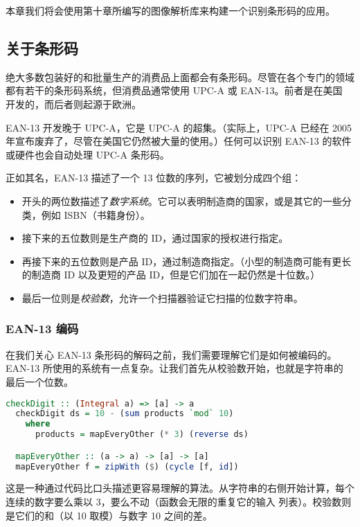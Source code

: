 \documentclass[./main.tex]{subfiles}
\begin{document}
本章我们将会使用第十章所编写的图像解析库来构建一个识别条形码的应用。

\subsection*{关于条形码}

绝大多数包装好的和批量生产的消费品上面都会有条形码。尽管在各个专门的领域都有若干的条形码系统，但消费品通常使用 UPC-A 或 EAN-13。前者是在美国
开发的，而后者则起源于欧洲。

EAN-13 开发晚于 UPC-A，它是 UPC-A 的超集。（实际上，UPC-A 已经在 2005 年宣布废弃了，尽管在美国它仍然被大量的使用。）任何可以识别 EAN-13
的软件或硬件也会自动处理 UPC-A 条形码。

正如其名，EAN-13 描述了一个 13 位数的序列，它被划分成四个组：

\begin{itemize}
  \item 开头的两位数描述了\textit{数字系统}。它可以表明制造商的国家，或是其它的一些分类，例如 ISBN（书籍身份）。
  \item 接下来的五位数则是生产商的 ID，通过国家的授权进行指定。
  \item 再接下来的五位数则是产品 ID，通过制造商指定。（小型的制造商可能有更长的制造商 ID 以及更短的产品 ID，但是它们加在一起仍然是十位数。）
  \item 最后一位则是\textit{校验数}，允许一个扫描器验证它扫描的位数字符串。
\end{itemize}

\subsubsection*{EAN-13 编码}

在我们关心 EAN-13 条形码的解码之前，我们需要理解它们是如何被编码的。EAN-13 所使用的系统有一点复杂。让我们首先从校验数开始，也就是字符串的
最后一个位数。

\begin{lstlisting}[language=Haskell]
  checkDigit :: (Integral a) => [a] -> a
  checkDigit ds = 10 - (sum products `mod` 10)
    where
      products = mapEveryOther (* 3) (reverse ds)

  mapEveryOther :: (a -> a) -> [a] -> [a]
  mapEveryOther f = zipWith ($) (cycle [f, id])
\end{lstlisting}

这是一种通过代码比口头描述更容易理解的算法。从字符串的右侧开始计算，每个连续的数字要么乘以 3，要么不动（函数会无限的重复它的输入
列表）。校验数则是它们的和（以 10 取模）与数字 10 之间的差。
\end{document}
